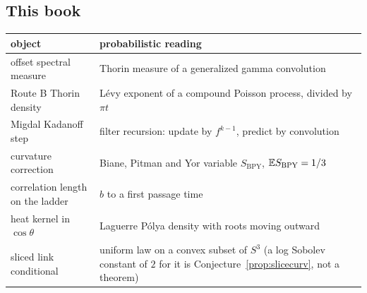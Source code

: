 \subsection{This book}
\begin{center}
\small
\begin{tabular}{p{1.95in}p{2.2in}}
\toprule
object & probabilistic reading \\ \midrule
offset spectral measure & Thorin measure of a generalized gamma convolution \\
Route B Thorin density & L\'evy exponent of a compound Poisson process, divided by $\pi t$ \\
Migdal Kadanoff step & filter recursion: update by $f^{k-1}$, predict by convolution \\
curvature correction & Biane, Pitman and Yor variable $S_{\mathrm{BPY}}$, $\mathbb{E} S_{\mathrm{BPY}}=1/3$ \\
correlation length on the ladder & $b$ to a first passage time \\
heat kernel in $\cos\theta$ & Laguerre P\'olya density with roots moving outward \\
sliced link conditional & uniform law on a convex subset of $S^3$ (a log Sobolev constant of $2$ for it is Conjecture~\ref{prop:slicecurv}, not a theorem) \\
\bottomrule
\end{tabular}
\end{center}
